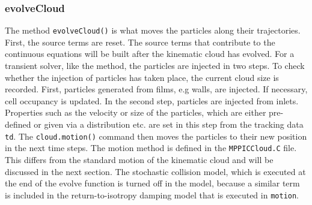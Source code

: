\subsubsection{evolveCloud}
The method \lstinline|evolveCloud()| is what moves the particles along their trajectories. 
First, the source terms are reset. The source terms that contribute to the continuous equations will be built after the kinematic cloud has evolved.
For a transient solver, like the \MP method, the particles are injected in two steps.
To check whether the injection of particles has taken place, the current cloud size is recorded.
First, particles generated from films, e.g walls, are injected.
If necessary, cell occupancy is updated.
In the second step, particles are injected from inlets.
Properties such as the velocity or size of the particles, which are either pre-defined or given via a distribution etc. are set in this step from the tracking data \lstinline|td|.
The \lstinline|cloud.motion()| command then moves the particles to their new position in  the next time steps.
The motion method is defined in the \lstinline|MPPICCloud.C| file. This differs from the standard motion of the kinematic cloud and will be discussed in the next section.
The stochastic collision model, which is executed at the end of the evolve function is turned off in the \MP model, because a similar term is included in the return-to-isotropy damping model that is executed in \lstinline|motion|.

